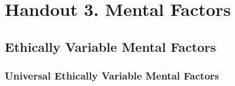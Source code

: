 \documentclass[a4 paper, 12pt]{article}
\begin{document}
\pagestyle{empty}

\section*{Handout 3. Mental Factors}

\subsection*{Ethically Variable Mental Factors}

\subsubsection*{Universal Ethically Variable Mental Factors}

\setlength{\tabcolsep}{0pt}
\renewcommand{\arraystretch}{1.1}
\end{document}

